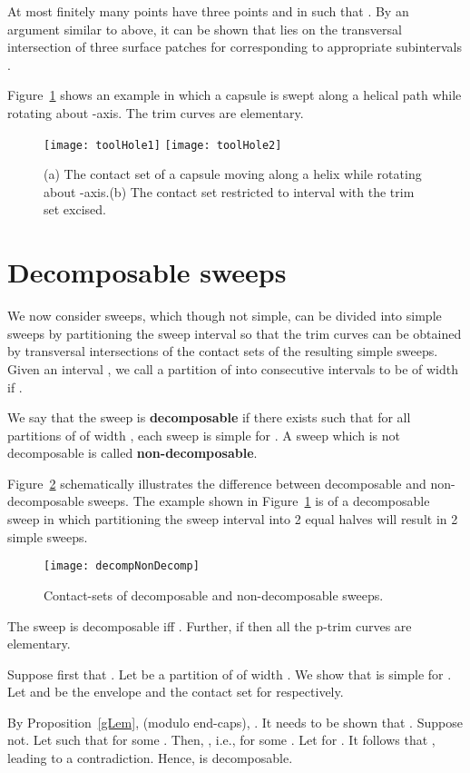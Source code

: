 \documentclass{elsart5p}
\newcommand{\eat}[1]{}
\begin{document}
 At most finitely many points  have three points  and  in  such 
that .  By an argument similar to above, it can be shown that  lies on the transversal 
intersection of three surface patches  for  corresponding to appropriate 
subintervals .
\hfill 


Figure~\ref{toolFig} shows an example in which a capsule is swept along a helical path while rotating about 
-axis.  The trim curves are elementary.


\begin{figure}
 \centering
 \texttt{[image: toolHole1]}
 \texttt{[image: toolHole2]}
 \caption{(a) The contact set of a capsule moving along a helix while rotating 
about -axis.(b) The contact set restricted to interval  with the trim set excised.}
 \label{toolFig}
\end{figure}

\section{Decomposable sweeps} \label{decompSec}

We now consider sweeps, which though not simple, can be divided into simple sweeps by 
partitioning the sweep interval so that the trim curves can be obtained by transversal intersections 
of the contact sets of the resulting simple sweeps.
Given an interval , we call a partition  of  
into consecutive intervals  to be of width  if .
\begin{defn} \label{decompDef}
We say that the sweep  is {\bf decomposable}
if there exists  such that for all partitions  of  of width , 
each sweep  is simple for  . A sweep
which is not decomposable is called {\bf non-decomposable}.
\end{defn}
Figure~\ref{decompNonDecompFig} schematically illustrates the difference between decomposable 
and non-decomposable sweeps.  The example shown in Figure~\ref{toolFig} is of a decomposable sweep 
in which partitioning the sweep interval  into 2 equal halves will result in 2 simple sweeps. 
\begin{figure}
 \centering
 \texttt{[image: decompNonDecomp]}
 \caption{Contact-sets of decomposable and non-decomposable sweeps.}
 \label{decompNonDecompFig}
\end{figure}

\begin{prop} \label{decompLem}
The sweep  is decomposable iff . Further, if  
then all the p-trim curves are elementary.
\end{prop}
 Suppose first that .  Let  be a partition of  of width 
.  We show that  is simple for . 
Let  and  be the envelope and the contact set for  respectively.
\eat{
and  be the correspondence for  ,i.e., 
. Further, we set .}
By Proposition~\ref{gLem}, (modulo end-caps), . 
It needs to be shown that .  
Suppose not.  Let  such that 
 for some .  Then, , i.e.,   for some .  Let  for .  It follows that ,  leading to a contradiction.
Hence,  is decomposable.
\end{document}
